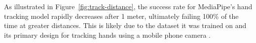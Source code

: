 \begin{invisBox}
    \hfill
\end{invisBox}

As illustrated in Figure~\ref{fig:track-distance}, the success rate for MediaPipe's hand tracking model rapidly decreases after 1 meter, ultimately failing 100\% of the time at greater distances. This is likely due to the dataset it was trained on and its primary design for tracking hands using a mobile phone camera \cite{dlib09}. \\

